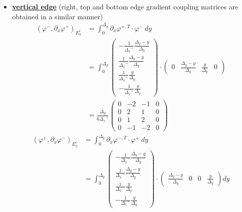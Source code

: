 \documentclass{mc2013}
\newcommand\bs{\boldsymbol}
\newcommand\tf{\varphi}
\renewcommand{\(}{\left(}
\renewcommand{\)}{\right)}
\renewcommand{\[}{\left[}
\renewcommand{\]}{\right]}
\begin{document}
\begin{itemize}
\item \underline{{\bf vertical edge}} (right, top and bottom edge gradient coupling matrices are obtained in a similar manner)  %
\begin{equation}
\begin{split}
\(\tf^-,\partial_x \tf^{+}\)_{E_h^i} & = \int_0^{\Delta _y} \partial_x \tf^{+,T}\cdot
\tf^-\ dy\\
&= \int_0^{\Delta _y}
\begin{pmatrix}
-\frac{1}{{\Delta _x}^+} \frac{{\Delta _y}-y}{{\Delta _y}} \\
\frac{1}{{\Delta _x}^+} \frac{{\Delta _y}-y}{{\Delta _y}} \\
\frac{1}{{\Delta _x}^+} \frac{y}{{\Delta _y}} \\
-\frac{1}{{\Delta _x}^+} \frac{y}{{\Delta _y}} 
\end{pmatrix}
\cdot
\begin{pmatrix}
0 & \frac{{\Delta _y}-y}{{\Delta _y}} & \frac{y}{{\Delta _y}} & 0
\end{pmatrix}\\
&= \frac{{\Delta _y}}{6{\Delta _x}^+}
\begin{pmatrix}
0 & -2 & -1 & 0 \\
0 & 2 & 1 & 0 \\
0 & 1 & 2 & 0 \\
0 & -1 & -2 & 0
\end{pmatrix}
\end{split}
\end{equation}
\begin{equation}
\begin{split}
\(\tf^+,\partial_x \tf^{-}\)_{E_h^i} &= \int_0^{{\Delta _y}} \partial_x \tf^{-,T}\cdot
\tf^+\ dy\\
& = \int_0^{\Delta _y} 
\begin{pmatrix}
-\frac{1}{{\Delta _x}^-} \frac{{\Delta _y}-y}{{\Delta _y}} \\
\frac{1}{{\Delta _x}^-} \frac{{\Delta _y}-y}{{\Delta _y}} \\
\frac{1}{{\Delta _x}^-} \frac{y}{{\Delta _y}} \\
-\frac{1}{{\Delta _x}^-} \frac{y}{{\Delta _y}}
\end{pmatrix}
\cdot
\begin{pmatrix}
\frac{{\Delta _y}-y}{{\Delta _y}} & 0 & 0 & \frac{y}{{\Delta _y}}
\end{pmatrix}
dy\\

\end{split}
\end{equation}
\end{itemize}
\end{document}
